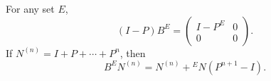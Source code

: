 For any set $E$,
$$(I - P)B^E = \begin{pmatrix} I - P^E & 0 \\ 0 & 0 \end{pmatrix}.$$
If $N^{(n)} = I + P + \cdots + P^n$, then
$$B^E N^{(n)} = N^{(n)} + {}^E N(P^{n+1} - I).$$
